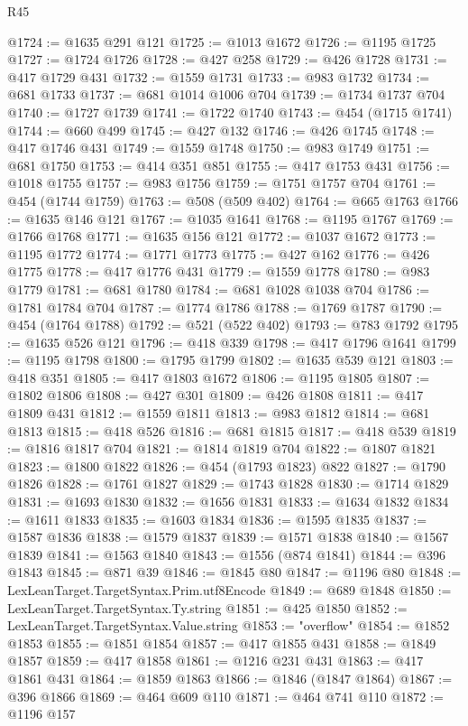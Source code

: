 \begin{lexlean}{R45}
\begin{coremodule}
{{{{{{{{{{{{{{{{{{{{{{{{{{{{{{{{{{{{{{{{{{{{{{{{{{{{{{{{{{{{{{{{{{{{{{{{{{{{{{{{{{{{{{{{{{{@1724 := @1635 @291 @121
@1725 := @1013 @1672
@1726 := @1195 @1725
@1727 := @1724 @1726
@1728 := @427 @258
@1729 := @426 @1728
@1731 := @417 @1729 @431
@1732 := @1559 @1731
@1733 := @983 @1732
@1734 := @681 @1733
@1737 := @681 @1014 @1006 @704
@1739 := @1734 @1737 @704
@1740 := @1727 @1739
@1741 := @1722 @1740
@1743 := @454 (@1715 @1741)
@1744 := @660 @499
@1745 := @427 @132
@1746 := @426 @1745
@1748 := @417 @1746 @431
@1749 := @1559 @1748
@1750 := @983 @1749
@1751 := @681 @1750
@1753 := @414 @351 @851
@1755 := @417 @1753 @431
@1756 := @1018 @1755
@1757 := @983 @1756
@1759 := @1751 @1757 @704
@1761 := @454 (@1744 @1759)
@1763 := @508 (@509 @402)
@1764 := @665 @1763
@1766 := @1635 @146 @121
@1767 := @1035 @1641
@1768 := @1195 @1767
@1769 := @1766 @1768
@1771 := @1635 @156 @121
@1772 := @1037 @1672
@1773 := @1195 @1772
@1774 := @1771 @1773
@1775 := @427 @162
@1776 := @426 @1775
@1778 := @417 @1776 @431
@1779 := @1559 @1778
@1780 := @983 @1779
@1781 := @681 @1780
@1784 := @681 @1028 @1038 @704
@1786 := @1781 @1784 @704
@1787 := @1774 @1786
@1788 := @1769 @1787
@1790 := @454 (@1764 @1788)
@1792 := @521 (@522 @402)
@1793 := @783 @1792
@1795 := @1635 @526 @121
@1796 := @418 @339
@1798 := @417 @1796 @1641
@1799 := @1195 @1798
@1800 := @1795 @1799
@1802 := @1635 @539 @121
@1803 := @418 @351
@1805 := @417 @1803 @1672
@1806 := @1195 @1805
@1807 := @1802 @1806
@1808 := @427 @301
@1809 := @426 @1808
@1811 := @417 @1809 @431
@1812 := @1559 @1811
@1813 := @983 @1812
@1814 := @681 @1813
@1815 := @418 @526
@1816 := @681 @1815
@1817 := @418 @539
@1819 := @1816 @1817 @704
@1821 := @1814 @1819 @704
@1822 := @1807 @1821
@1823 := @1800 @1822
@1826 := @454 (@1793 @1823) @822
@1827 := @1790 @1826
@1828 := @1761 @1827
@1829 := @1743 @1828
@1830 := @1714 @1829
@1831 := @1693 @1830
@1832 := @1656 @1831
@1833 := @1634 @1832
@1834 := @1611 @1833
@1835 := @1603 @1834
@1836 := @1595 @1835
@1837 := @1587 @1836
@1838 := @1579 @1837
@1839 := @1571 @1838
@1840 := @1567 @1839
@1841 := @1563 @1840
@1843 := @1556 (@874 @1841)
@1844 := @396 @1843
@1845 := @871 @39
@1846 := @1845 @80
@1847 := @1196 @80
@1848 := LexLeanTarget.TargetSyntax.Prim.utf8Encode
@1849 := @689 @1848
@1850 := LexLeanTarget.TargetSyntax.Ty.string
@1851 := @425 @1850
@1852 := LexLeanTarget.TargetSyntax.Value.string
@1853 := "overflow"
@1854 := @1852 @1853
@1855 := @1851 @1854
@1857 := @417 @1855 @431
@1858 := @1849 @1857
@1859 := @417 @1858
@1861 := @1216 @231 @431
@1863 := @417 @1861 @431
@1864 := @1859 @1863
@1866 := @1846 (@1847 @1864)
@1867 := @396 @1866
@1869 := @464 @609 @110
@1871 := @464 @741 @110
@1872 := @1196 @157
}}}}}}}}}}}}}}}}}}}}}}}}}}}}}}}}}}}}}}}}}}}}}}}}}}}}}}}}}}}}}}}}}}}}}}}}}}}}}}}}}}}}}}}}}}}
\end{coremodule}
\end{lexlean}
